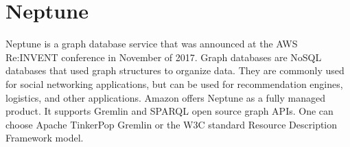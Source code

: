 \section{Neptune}
Neptune is a graph database service that was announced at the AWS
Re:INVENT conference in November of
2017\cite{hid-sp18-419-www-tc_neptune}. Graph databases are NoSQL
databases that used graph structures to organize
data\cite{hid-sp18-419-www-tp-graph-db}. They are commonly used for
social networking applications, but can be used for recommendation
engines, logistics, and other applications. Amazon offers Neptune as a
fully managed product. It supports Gremlin and SPARQL open source
graph APIs. One can choose Apache TinkerPop Gremlin or the W3C
standard Resource Description Framework
model\cite{hid-sp18-419-www-aws-neptune}.

